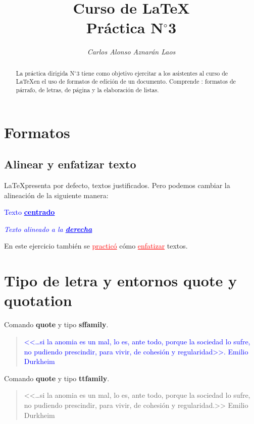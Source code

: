 \documentclass[12pt,a4paper]{article}
\author{\textit{Carlos Alonso Aznarán Laos}}
\title{\textcolor{NavyBlue}{Curso de \LaTeX}\\\textcolor{NavyBlue}{{\normalsize \textbf{Práctica N$ ^{\circ}$3}}}}%
\begin{document}
\maketitle

\begin{abstract}
La práctica dirigida N$ ^{\circ}$3 tiene como objetivo ejercitar a los asistentes al curso de \LaTeX en el uso de formatos de edición de un documento. Comprende : formatos de párrafo, de letras, de página y la elaboración de listas.
\end{abstract}

\section{Formatos}

\subsection{Alinear y enfatizar texto}
\LaTeX presenta por defecto, textos justificados. Pero podemos cambiar la alineación de la siguiente manera:
\begin{center}
\textcolor{Blue}{Texto \textbf{\underline{centrado}}}
\end{center}
\begin{flushright}
\textcolor{Blue}{
\textit{Texto alineado a la \underline{\textbf{derecha}}}}
\end{flushright}
En este ejercicio también se \textcolor{Red}{\underline{practicó}} cómo \textcolor{Red}{\underline{enfatizar}} textos.

\section{Tipo de letra y entornos quote y quotation}

Comando \textbf{quote} y tipo \textbf{sffamily}.
\begin{quote}
\sffamily
\textcolor{Blue}{<<\ldots si la anomia es un mal, lo es, ante todo, porque la sociedad lo sufre, no pudiendo prescindir, para vivir, de cohesión y regularidad>>. Emilio Durkheim}
\end{quote}
Comando \textbf{quote} y tipo \textbf{ttfamily}.
\begin{quote}
\ttfamily
<<\ldots si la anomia es un mal, lo es, ante todo, porque la sociedad lo sufre, no pudiendo prescindir, para vivir, de cohesión y regularidad.>> Emilio Durkheim
\end{quote}
\end{document}
